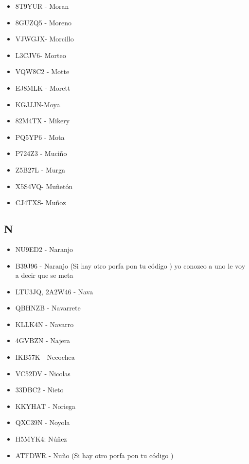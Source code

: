 \begin{itemize}[leftmargin=*,nosep]
\item 8T9YUR  -  Moran
\item 8GUZQ5 - Moreno
\item VJWGJX- Morcillo
\item L3CJV6- Morteo
\item VQW8C2 - Motte
\item EJ8MLK - Morett
\item KGJJJN-Moya
\item 82M4TX - Mikery
\item PQ5YP6 - Mota
\item P724Z3 - Muciño
\item Z5B27L - Murga
\item X5S4VQ- Muñetón
\item CJ4TXS- Muñoz
\end{itemize}

\subsection*{N}
\begin{itemize}[leftmargin=*,nosep]
\item NU9ED2 - Naranjo
\item B39J96 - Naranjo (Si hay otro porfa pon tu código ) yo conozco a uno le voy a decir que se meta 
\item LTU3JQ, 2A2W46  -  Nava
\item QBHNZB - Navarrete
\item KLLK4N - Navarro
\item 4GVBZN - Najera
\item IKB57K  -  Necochea
\item VC52DV - Nicolas
\item 33DBC2 - Nieto
\item KKYHAT - Noriega
\item QXC39N - Noyola
\item H5MYK4: Núñez
\item ATFDWR  -  Nuño (Si hay otro porfa pon tu código )
\end{itemize}

